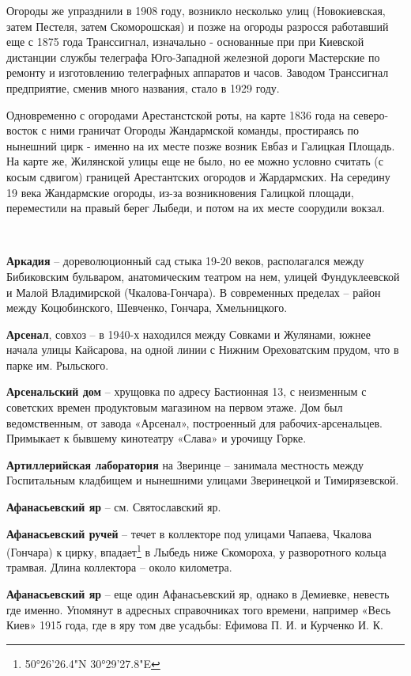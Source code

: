 Огороды же упразднили в 1908 году, возникло несколько улиц (Новокиевская, затем Пестеля, затем Скоморошская) и позже на огороды разросся работавший еще с 1875 года Транссигнал, изначально - основанные при при Киевской дистанции службы телеграфа Юго-Западной железной дороги Мастерские по ремонту и изготовлению телеграфных аппаратов и часов. Заводом Транссигнал предприятие, сменив много названия, стало в 1929 году.

Одновременно с огородами Арестанстской роты, на карте 1836 года на северо-восток с ними граничат Огороды Жандармской команды, простираясь по нынешний цирк - именно на их месте позже возник Евбаз и Галицкая Площадь. На карте же, Жилянской улицы еще не было, но ее можно условно считать (с косым сдвигом) границей Арестантских огородов и Жардармских. На середину 19 века Жандармские огороды, из-за возникновения Галицкой площади, переместили на правый берег Лыбеди, и потом на их месте соорудили вокзал.

\\

\medskip


\textbf{Аркадия} – дореволюционный сад стыка 19-20 веков, располагался между Бибиковским бульваром, анатомическим театром на нем, улицей Фундуклеевской и Малой Владимирской (Чкалова-Гончара). В современных пределах – район между Коцюбинского, Шевченко, Гончара, Хмельницкого.\\ 

\medskip


\textbf{Арсенал}, совхоз – в 1940-х находился между Совками и Жулянами, южнее начала улицы Кайсарова, на одной линии с Нижним Ореховатским прудом, что в парке им. Рыльского.\\

\medskip


\textbf{Арсенальский дом} – хрущовка по адресу Бастионная 13, с неизменным с советских времен продуктовым магазином на первом этаже. Дом был ведомственным, от завода «Арсенал», построенный для рабочих-арсенальцев. Примыкает к бывшему кинотеатру «Слава» и урочищу Горке.\\

\medskip


\textbf{Артиллерийская лаборатория} на Зверинце – занимала местность между Госпитальным кладбищем и нынешними улицами Зверинецкой и Тимирязевской.\\

\medskip


\textbf{Афанасьевский яр} – см. Святославский яр.\\

\medskip


\textbf{Афанасьевский ручей} – течет в коллекторе под улицами Чапаева, Чкалова (Гончара) к цирку, впадает\footnote{50°26'26.4"N 30°29'27.8"E} в Лыбедь ниже Скомороха, у разворотного кольца трамвая. Длина коллектора – около километра.\\

\medskip


\textbf{Афанасьевский яр} – еще один Афанасьевский яр, однако в Демиевке, невесть где именно. Упомянут в адресных справочниках того времени, например «Весь Киев» 1915 года, где в яру том две усадьбы: Ефимова П. И. и Курченко И. К.
